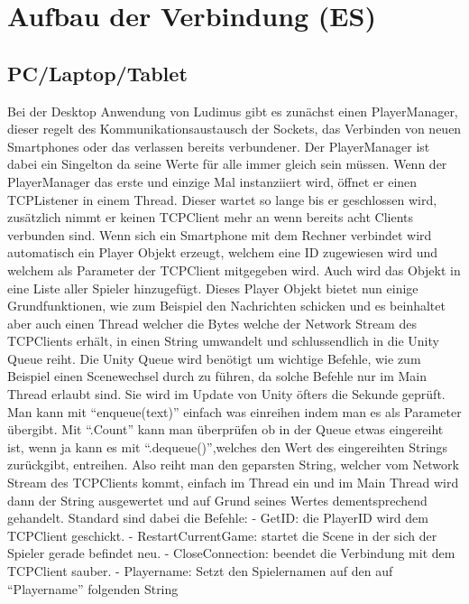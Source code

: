 \section{Aufbau der Verbindung (ES)} 
\subsection{PC/Laptop/Tablet}
Bei der Desktop Anwendung von Ludimus gibt es zunächst einen PlayerManager, dieser regelt des Kommunikationsaustausch der Sockets, das Verbinden von neuen Smartphones oder das verlassen bereits verbundener. Der PlayerManager ist dabei ein Singelton da seine Werte für alle immer gleich sein müssen. Wenn der PlayerManager das erste und einzige Mal instanziiert wird, öffnet er einen TCPListener in einem Thread. Dieser wartet so lange bis er geschlossen wird, zusätzlich nimmt er keinen TCPClient mehr an wenn bereits acht Clients verbunden sind. Wenn sich ein Smartphone mit dem Rechner verbindet wird automatisch ein Player Objekt erzeugt, welchem eine ID zugewiesen wird und welchem als Parameter der TCPClient mitgegeben wird. Auch wird das Objekt in eine Liste aller Spieler hinzugefügt. Dieses Player Objekt bietet nun einige Grundfunktionen, wie zum Beispiel den Nachrichten schicken und es beinhaltet aber auch einen Thread welcher die Bytes welche der Network Stream des TCPClients erhält, in einen String umwandelt und schlussendlich in die Unity Queue reiht. Die Unity Queue wird benötigt um wichtige Befehle, wie zum Beispiel einen Scenewechsel durch zu führen, da solche Befehle nur im Main Thread erlaubt sind. Sie wird im Update von Unity öfters die Sekunde geprüft. Man kann mit “enqueue(text)” einfach was einreihen indem man es als Parameter übergibt. Mit “.Count” kann man überprüfen ob in der Queue etwas eingereiht ist, wenn ja kann es mit “.dequeue()”,welches den Wert des eingereihten Strings zurückgibt, entreihen. Also reiht man den geparsten String, welcher vom Network Stream des TCPClients kommt, einfach im Thread ein und im Main Thread wird dann der String ausgewertet und auf Grund seines Wertes dementsprechend gehandelt. Standard sind dabei die Befehle:
\newline \tab 
- GetID: die PlayerID wird dem TCPClient geschickt.
\newline \tab  
- RestartCurrentGame: startet die Scene in der sich der Spieler gerade befindet \tab neu.
\newline \tab 
- CloseConnection: beendet die Verbindung mit dem TCPClient sauber.
\newline \tab 
- Playername: Setzt den Spielernamen auf den auf “Playername” folgenden String
